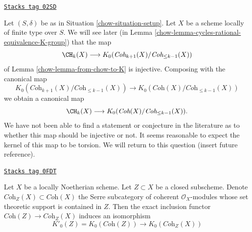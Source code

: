 \begin{remark}
\label{chow-remark-good-cases-K-A}
\href{https://stacks.math.columbia.edu/tag/02SD}{\texttt{Stacks tag 02SD}}

Let $(S, \delta)$ be as in Situation \ref{chow-situation-setup}.
Let $X$ be a scheme locally of finite type over $S$.
We will see later (in Lemma \ref{chow-lemma-cycles-rational-equivalence-K-group})
that the map
$$
\CH_k(X)
\longrightarrow
K_0(\textit{Coh}_{k + 1}(X)/\textit{Coh}_{\leq k - 1}(X))
$$
of Lemma \ref{chow-lemma-from-chow-to-K} is injective.
Composing with the canonical map
$$
K_0(\textit{Coh}_{k + 1}(X)/\textit{Coh}_{\leq k - 1}(X))
\longrightarrow
K_0(\textit{Coh}(X)/\textit{Coh}_{\leq k - 1}(X))
$$
we obtain a canonical map
$$
\CH_k(X)
\longrightarrow
K_0(\textit{Coh}(X)/\textit{Coh}_{\leq k - 1}(X)).
$$
We have not been able to find a statement or conjecture in the
literature as to whether this map should be injective or not.
It seems reasonable to expect the kernel of this map to be torsion.
We will return to this question (insert future reference).
\end{remark}

\begin{lemma}
\label{chow-lemma-K-coherent-supported-on-closed}
\href{https://stacks.math.columbia.edu/tag/0FDT}{\texttt{Stacks tag 0FDT}}

Let $X$ be a locally Noetherian scheme. Let $Z \subset X$ be a closed
subscheme. Denote $\textit{Coh}_Z(X) \subset \textit{Coh}(X)$
the Serre subcategory of coherent $\mathcal{O}_X$-modules whose
set theoretic support is contained in $Z$. Then the exact inclusion
functor $\textit{Coh}(Z) \to \textit{Coh}_Z(X)$ induces
an isomorphism
$$
K'_0(Z) = K_0(\textit{Coh}(Z)) \longrightarrow K_0(\textit{Coh}_Z(X))
$$
\end{lemma}

